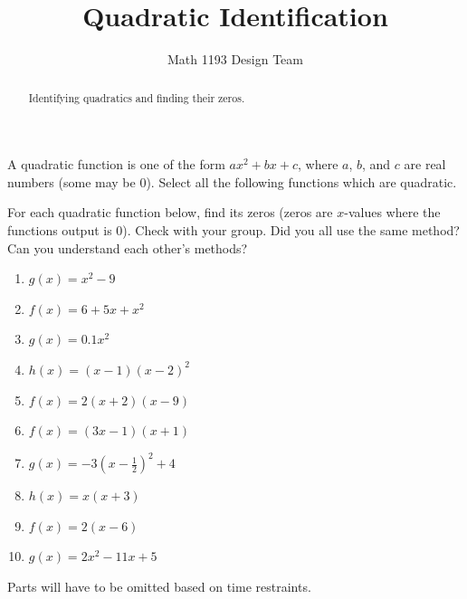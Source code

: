 \documentclass[noauthor]{ximera}
\title{Quadratic Identification}
\author{Math 1193 Design Team}
\begin{document}
\begin{abstract}
    Identifying quadratics and finding their zeros.
\end{abstract}
\maketitle

A quadratic function is one of the form \(ax^2 + bx + c\), where \(a\),
\(b\), and \(c\) are real numbers (some may be 0). Select all the 
following functions which are quadratic. 

For each quadratic function below, find its zeros (zeros are 
\(x\)-values where the functions output is 0). Check with your group.
Did you all use the same method? Can you understand each other's methods?

\begin{enumerate}
    \item \(g\left(x\right)=x^2-9\)
    \item \(f\left(x\right)=6+5x+x^2\)
    \item \(g\left(x\right)=0.1x^2\)
    \item \(h\left(x\right)=\left(x-1\right)\left(x-2\right)^2\)
    \item \(f\left(x\right)=2\left(x+2\right)\left(x-9\right)\)
    \item \(f\left(x\right)=\left(3x-1\right)\left(x+1\right)\)
    \item \(g\left(x\right)=-3\left(x-\frac{1}{2}\right)^2+4\)
    \item \(h\left(x\right)=x\left(x+3\right)\)
    \item \(f\left(x\right)=2\left(x-6\right)\)
    \item \(g\left(x\right)=2x^2-11x+5\)
\end{enumerate}

\begin{instructorNotes}
Parts will have to be omitted based on time restraints.
\end{instructorNotes}
\end{document}
